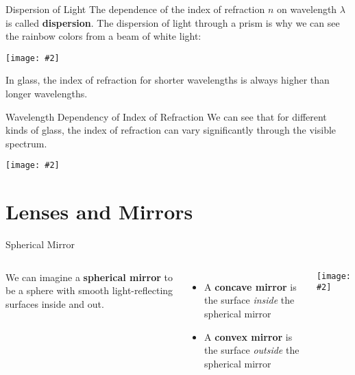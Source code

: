 \documentclass[compress,aspectratio=169]{beamer}
\newcommand{\pic}[2]{\texttt{[image: \#2]}}
\begin{document}
\begin{frame}{Dispersion of Light}
  The dependence of the index of refraction $n$ on wavelength $\lambda$ is
  called \textbf{dispersion}. The dispersion of light through a prism is why we
  can see the rainbow colors from a beam of white light:
  \begin{center}
    \pic{.3}{graphics/Prism_rainbow_schema.png}
  \end{center}
  In glass, the index of refraction for shorter wavelengths is always higher
  than longer wavelengths.
\end{frame}



\begin{frame}{Wavelength Dependency of Index of Refraction}
  We can see that for different kinds of glass, the index of refraction can vary
  significantly through the visible spectrum.
  \begin{center}
    \pic{.4}{graphics/Dispersion-curve.png}
  \end{center}
\end{frame}



\section{Lenses and Mirrors}

\begin{frame}{Spherical Mirror}
  \begin{columns}
    We can imagine a \textbf{spherical mirror} to be a sphere with smooth
    light-reflecting surfaces inside and out.
    \begin{itemize}
    \item A \textbf{concave mirror} is the surface \emph{inside} the spherical
      mirror
    \item A \textbf{convex mirror} is the surface \emph{outside} the spherical
      mirror
    \end{itemize}
    \pic{1}{graphics/spherical-mirror.png}
  \end{columns}
\end{frame}
\end{document}
